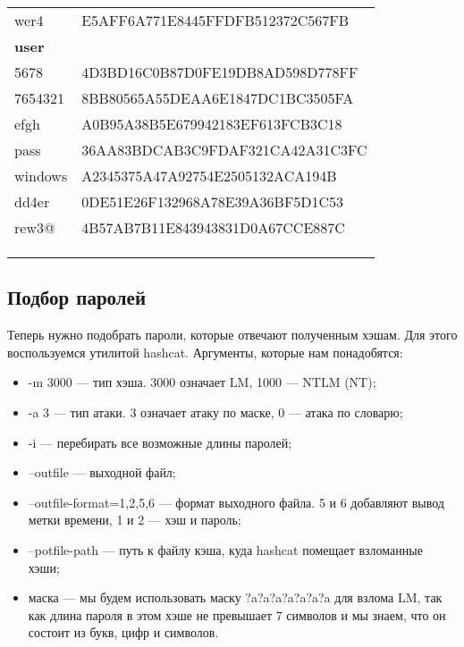 \begin{table}[]
\begin{tabular}{ll}
    wer4          & E5AFF6A771E8445FFDFB512372C567FB \\
    \textbf{user} &                                  \\
    5678          & 4D3BD16C0B87D0FE19DB8AD598D778FF \\
    7654321       & 8BB80565A55DEAA6E1847DC1BC3505FA \\
    efgh          & A0B95A38B5E679942183EF613FCB3C18 \\
    pass          & 36AA83BDCAB3C9FDAF321CA42A31C3FC \\
    windows       & A2345375A47A92754E2505132ACA194B \\
    dd4er         & 0DE51E26F132968A78E39A36BF5D1C53 \\
    rew3@         & 4B57AB7B11E843943831D0A67CCE887C \\
                  &                                  \\
                  &                                  \\
                  &                                 
    \end{tabular}
    \end{table}
\clearpage

\subsection{Подбор паролей}
Теперь нужно подобрать пароли, которые отвечают полученным хэшам. Для этого воспользуемся утилитой hashcat. Аргументы, которые нам понадобятся:
\begin{itemize}
    \item -m 3000 — тип хэша. 3000 означает LM, 1000 — NTLM (NT);
    \item -a 3 — тип атаки. 3 означает атаку по маске, 0 — атака по словарю;
    \item -i — перебирать все возможные длины паролей;
    \item --outfile — выходной файл;
    \item --outfile-format=1,2,5,6 — формат выходного файла. 5 и 6 добавляют вывод метки времени, 1 и 2 — хэш и пароль;
    \item --potfile-path — путь к файлу кэша, куда hashcat помещает взломанные хэши;
    \item маска — мы будем использовать маску ?a?a?a?a?a?a?a для взлома LM, так как длина пароля в этом хэше не превышает 7 символов и мы знаем, что он состоит из букв, цифр и символов.
\end{itemize}

